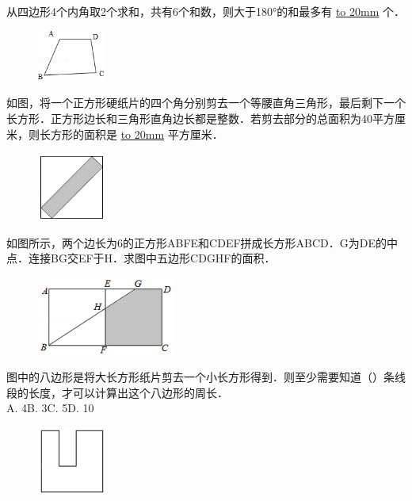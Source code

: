 \item {
    {从四边形4个内角取2个求和，共有6个和数，则大于180°的和最多有 \underline{\hbox to 20mm{}} 个．} 
    \begin{figure}[H] 
        \centering
        \includegraphics[width=0.2\textwidth]{./pics/Chapter_3/11.png}
    \end{figure}
    \vspace{1cm}
}
\item {
    {如图，将一个正方形硬纸片的四个角分别剪去一个等腰直角三角形，最后剩下一个长方形．正方形边长和三角形直角边长都是整数．若剪去部分的总面积为40平方厘米，则长方形的面积是 \underline{\hbox to 20mm{}} 平方厘米．} 
    \begin{figure}[H] 
        \centering
        \includegraphics[width=0.2\textwidth]{./pics/Chapter_3/12.png}
    \end{figure}
    \vspace{1cm}
}

\item {
    {如图所示，两个边长为6的正方形ABFE和CDEF拼成长方形ABCD．G为DE的中点．连接BG交EF于H．求图中五边形CDGHF的面积．} 
    \begin{figure}[H] 
        \centering
        \includegraphics[width=0.4\textwidth]{./pics/Chapter_3/13.png}
    \end{figure}
    \vspace{1cm}
}
\item {
    {图中的八边形是将大长方形纸片剪去一个小长方形得到．则至少需要知道（\quad）条线段的长度，才可以计算出这个八边形的周长．} \\
    {A. 4\quad B. 3\quad C. 5\quad D. 10}
    \begin{figure}[H] 
        \centering
        \includegraphics[width=0.2\textwidth]{./pics/Chapter_3/14.png}
    \end{figure}
    \vspace{1cm}
}

